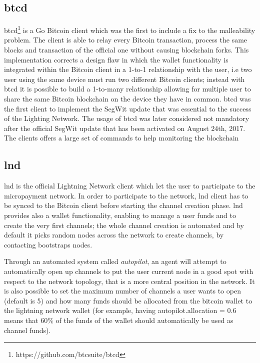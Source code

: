	\subsection{btcd}
	
	btcd\footnote{https://github.com/btcsuite/btcd} is a Go Bitcoin client which was the first to include a fix to the malleability problem. The client is able to relay every Bitcoin transaction, process the same blocks and transaction of the official one without causing blockchain forks. This implementation corrects a design flaw in which the wallet functionality is integrated within the Bitcoin client in a 1-to-1 relationship with the user, i.e two user using the same device must run two different Bitcoin clients; instead with btcd it is possible to build a 1-to-many relationship allowing for multiple user to share the same Bitcoin blockchain on the device they have in common. btcd was the first client to implement the SegWit update that was essential to the success of the Lighting Network. The usage of btcd was later considered not mandatory after the official SegWit update that has been activated on August 24th, 2017. The clients offers a large set of commands to help monitoring the blockchain
	
	\subsection{lnd}
	
	lnd is the official Lightning Network client which let the user to participate to the micropayment network. In order to participate to the network, lnd client has to be synced to the Bitcoin client before starting the channel creation phase. lnd provides also a wallet functionality, enabling to manage a user funds and to create the very first channels; the whole channel creation is automated and by default it picks random nodes across the network to create channels, by contacting bootstraps nodes. 
	
	Through an automated system called \textit{autopilot}, an agent will attempt to automatically open up channels to put the user current node in a good spot with respect to the network topology, that is a more central position in the network. It is also possible to set the maximum number of channels a user wants to open (default is 5) and how many funds should be allocated from the bitcoin wallet to the lightning network wallet (for example, having autopilot.allocation = 0.6 means that 60\% of the funds of the wallet should automatically be used as channel funds).
	
